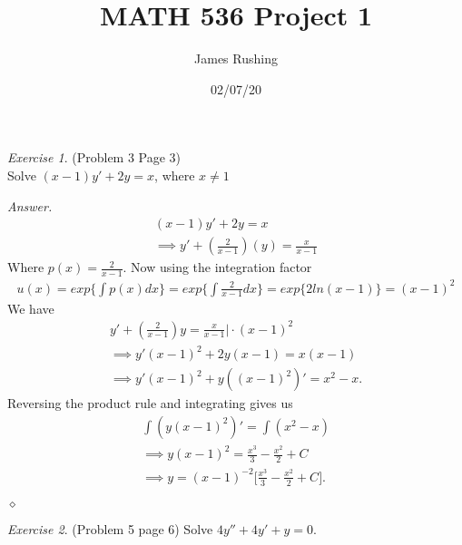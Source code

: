 \documentclass[12pt,oneside]{amsart}
\title{MATH 536 Project 1}
\author{James Rushing}
\date{02/07/20}
\theoremstyle{definition}
\theoremstyle{remark}
\newtheorem{exer}{Exercise}
\numberwithin{equation}{exer}
\newenvironment{answer}{\bigskip\noindent\emph{Answer.}}{\hfill$\diamond$\newline}
\begin{document}
\maketitle

\begin{exer} (Problem 3 Page 3)
\\\newline
Solve $(x-1)y'+ 2y =x$, where $x\neq1$
\end{exer}

\begin{answer}
\begin{align*}
    (x-1)y'+ 2y =x \\
 \implies y' +\left(\frac{2}{x-1}\right)(y) = \frac{x}{x-1} 
\end{align*}
\newline
Where $p(x) = \frac{2}{x-1}$. Now using the integration factor 
\newline
\begin{align*}
    u(x) =  exp\Big\{\int p(x)dx\Big\}=exp\Big\{\int \frac{2}{x-1}dx\Big\} = exp\Big\{2ln(x-1)\Big\} = (x-1)^2
\end{align*}
\newline
We have
\begin{align*}
    y' + \left(\frac{2}{x-1}\right)y = \frac{x}{x-1}\Bigg|\cdot  (x-1)^2\\
    \implies y'(x-1)^2 + 2y(x-1) = x(x-1) \\
    \implies  y'(x-1)^2 + y((x-1)^2)' = x^2-x.
\end{align*}
\newline
Reversing the product rule and integrating gives us
\begin{align*}
    \int (y(x-1)^2)' = \int (x^2 - x)\\
    \implies y  (x-1)^{2}= \frac{x^3}{3} -\frac{x^2}{2} + C\\
    \implies y = (x-1)^{-2}\Big[\frac{x^3}{3} -\frac{x^2}{2} + C\Big].
\end{align*}

\end{answer}


\newpage
\begin{exer} (Problem 5 page 6)
Solve $4y'' + 4y' +y = 0$.
\end{exer}
\end{document}
